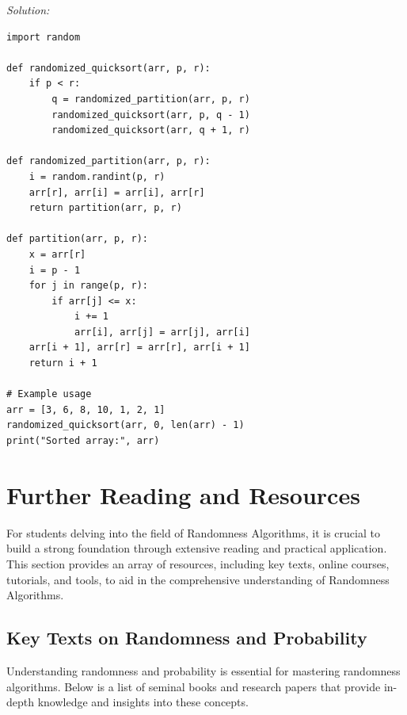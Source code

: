 \documentclass[12pt]{book} %
\begin{document}
\begin{itemize}
    \textit{Solution:}
    
    \begin{lstlisting}
import random

def randomized_quicksort(arr, p, r):
    if p < r:
        q = randomized_partition(arr, p, r)
        randomized_quicksort(arr, p, q - 1)
        randomized_quicksort(arr, q + 1, r)

def randomized_partition(arr, p, r):
    i = random.randint(p, r)
    arr[r], arr[i] = arr[i], arr[r]
    return partition(arr, p, r)

def partition(arr, p, r):
    x = arr[r]
    i = p - 1
    for j in range(p, r):
        if arr[j] <= x:
            i += 1
            arr[i], arr[j] = arr[j], arr[i]
    arr[i + 1], arr[r] = arr[r], arr[i + 1]
    return i + 1

# Example usage
arr = [3, 6, 8, 10, 1, 2, 1]
randomized_quicksort(arr, 0, len(arr) - 1)
print("Sorted array:", arr)
    \end{lstlisting}
    \FloatBarrier
\end{itemize}


\section{Further Reading and Resources}
For students delving into the field of Randomness Algorithms, it is crucial to build a strong foundation through extensive reading and practical application. This section provides an array of resources, including key texts, online courses, tutorials, and tools, to aid in the comprehensive understanding of Randomness Algorithms.

\subsection{Key Texts on Randomness and Probability}
Understanding randomness and probability is essential for mastering randomness algorithms. Below is a list of seminal books and research papers that provide in-depth knowledge and insights into these concepts.
\end{document}
